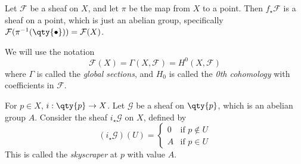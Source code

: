 \begin{example}
    Let \( \mathcal F \) be a sheaf on \( X \), and let \( \pi \) be the map from \( X \) to a point.
    Then \( f_\star \mathcal F \) is a sheaf on a point, which is just an abelian group, specifically \( \mathcal F(\pi^{-1}(\qty{\bullet})) = \mathcal F(X) \).
\end{example}
We will use the notation
\[ \mathcal F(X) = \Gamma(X, \mathcal F) = H^0(X, \mathcal F) \]
where \( \Gamma \) is called the \emph{global sections}, and \( H_0 \) is called the \emph{0th cohomology} with coefficients in \( \mathcal F \).

For \( p \in X \), \( i : \qty{p} \to X \).
Let \( \mathcal G \) be a sheaf on \( \qty{p} \), which is an abelian group \( A \).
Consider the sheaf \( i_\star \mathcal G \) on \( X \), defined by
\[ (i_\star \mathcal G)(U) = \begin{cases}
    0 & \text{if } p \notin U \\
    A & \text{if } p \in U
\end{cases} \]
This is called the \emph{skyscraper} at \( p \) with value \( A \).
